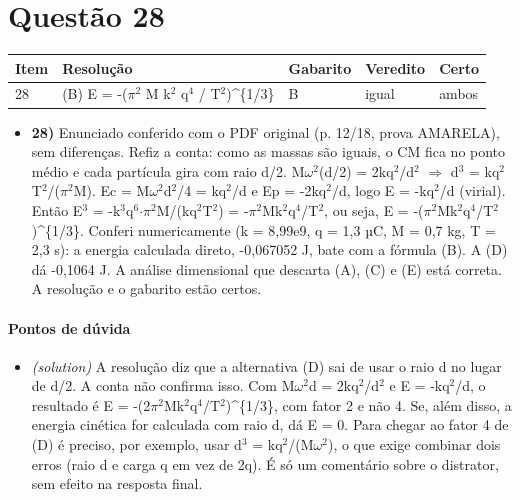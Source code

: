 \documentclass{article}%
\begin{document}
\section*{Questão 28}%
\begin{longtable}{@{}p{} p{} p{} p{} p{}@{}}\toprule Item & Resolução & Gabarito & Veredito & Certo \\ \midrule
28 & (B) E = -($\pi$$^2$ M k$^2$ q$^{4}$ / T$^2$)\^{}\{1/3\} & B & igual & ambos \\
\bottomrule\end{longtable}%
\begin{itemize}%
\item%
\textbf{28)} Enunciado conferido com o PDF original (p. 12/18, prova AMARELA), sem diferenças. Refiz a conta: como as massas são iguais, o CM fica no ponto médio e cada partícula gira com raio d/2. M$\omega$$^2$(d/2) = 2kq$^2$/d$^2$ $\Rightarrow$ d$^3$ = kq$^2$T$^2$/($\pi$$^2$M). Ec = M$\omega$$^2$d$^2$/4 = kq$^2$/d e Ep = -2kq$^2$/d, logo E = -kq$^2$/d (virial). Então E$^3$ = -k$^3$q$^{6}$$\cdot$$\pi$$^2$M/(kq$^2$T$^2$) = -$\pi$$^2$Mk$^2$q$^{4}$/T$^2$, ou seja, E = -($\pi$$^2$Mk$^2$q$^{4}$/T$^2$)\^{}\{1/3\}. Conferi numericamente (k = 8,99e9, q = 1,3 µC, M = 0,7 kg, T = 2,3 s): a energia calculada direto, -0,067052 J, bate com a fórmula (B). A (D) dá -0,1064 J. A análise dimensional que descarta (A), (C) e (E) está correta. A resolução e o gabarito estão certos.%
\end{itemize}%
\paragraph{Pontos de dúvida}%
\begin{itemize}%
\item%
\textit{(solution)} A resolução diz que a alternativa (D) sai de usar o raio d no lugar de d/2. A conta não confirma isso. Com M$\omega$$^2$d = 2kq$^2$/d$^2$ e E = -kq$^2$/d, o resultado é E = -(2$\pi$$^2$Mk$^2$q$^{4}$/T$^2$)\^{}\{1/3\}, com fator 2 e não 4. Se, além disso, a energia cinética for calculada com raio d, dá E = 0. Para chegar ao fator 4 de (D) é preciso, por exemplo, usar d$^3$ = kq$^2$/(M$\omega$$^2$), o que exige combinar dois erros (raio d e carga q em vez de 2q). É só um comentário sobre o distrator, sem efeito na resposta final.%
\end{itemize}%
\end{document}
